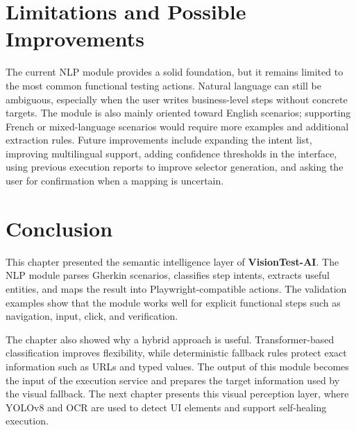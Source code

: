 \section{Limitations and Possible Improvements}
\label{sec:nlp_limitations}

The current NLP module provides a solid foundation, but it remains limited to the most common functional testing actions. Natural language can still be ambiguous, especially when the user writes business-level steps without concrete targets. The module is also mainly oriented toward English scenarios; supporting French or mixed-language scenarios would require more examples and additional extraction rules.
Future improvements include expanding the intent list, improving multilingual support, adding confidence thresholds in the interface, using previous execution reports to improve selector generation, and asking the user for confirmation when a mapping is uncertain.

\section{Conclusion}
\label{sec:ch3_conclusion}
This chapter presented the semantic intelligence layer of \textbf{VisionTest-AI}. The NLP module parses Gherkin scenarios, classifies step intents, extracts useful entities, and maps the result into Playwright-compatible actions. The validation examples show that the module works well for explicit functional steps such as navigation, input, click, and verification.

The chapter also showed why a hybrid approach is useful. Transformer-based classification improves flexibility, while deterministic fallback rules protect exact information such as URLs and typed values. The output of this module becomes the input of the execution service and prepares the target information used by the visual fallback. The next chapter presents this visual perception layer, where YOLOv8 and OCR are used to detect UI elements and support self-healing execution.
